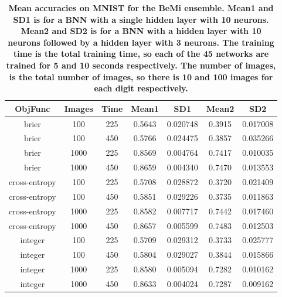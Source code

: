 \begin{center}
\begin{table}[!tb]
\centering
\begin{tabular}{|c|c|c|c|c|c|c|}
  \hline
ObjFunc & Images & Time & Mean1 & SD1 & Mean2 & SD2 \\ 
  \hline
brier & 100 & 225 & 0.5643 & 0.020748 & 0.3915 & 0.017008 \\ 
   \hline
brier & 100 & 450 & 0.5766 & 0.024475 & 0.3857 & 0.035266 \\ 
   \hline
brier & 1000 & 225 & 0.8569 & 0.004764 & 0.7417 & 0.010035 \\ 
   \hline
brier & 1000 & 450 & 0.8659 & 0.004340 & 0.7470 & 0.013553 \\ 
   \hline
cross-entropy & 100 & 225 & 0.5708 & 0.028872 & 0.3720 & 0.021409 \\ 
   \hline
cross-entropy & 100 & 450 & 0.5851 & 0.029226 & 0.3735 & 0.011863 \\ 
   \hline
cross-entropy & 1000 & 225 & 0.8582 & 0.007717 & 0.7442 & 0.017460 \\ 
   \hline
cross-entropy & 1000 & 450 & 0.8657 & 0.005599 & 0.7483 & 0.012503 \\ 
   \hline
integer & 100 & 225 & 0.5709 & 0.029312 & 0.3733 & 0.025777 \\ 
   \hline
integer & 100 & 450 & 0.5804 & 0.029027 & 0.3844 & 0.015866 \\ 
   \hline
integer & 1000 & 225 & 0.8580 & 0.005094 & 0.7282 & 0.010162 \\ 
   \hline
integer & 1000 & 450 & 0.8633 & 0.004024 & 0.7287 & 0.009162 \\ 
   \hline
\end{tabular}
\caption{\small{\textbf{Mean accuracies on MNIST for the BeMi ensemble. Mean1 and SD1 is for a BNN with a single hidden layer with
          10 neurons. Mean2 and SD2 is for a BNN with a hidden layer with 10 neurons followed by a hidden layer
          with 3 neurons. The training time is the total training time, so each of the 45 networks are trained for
          5 and 10 seconds respectively. The number of images, is the total number of images, so there is 10
          and 100 images for each digit respectively.}}} 
\label{BEMI_OBJ}
\end{table}

\end{center}
